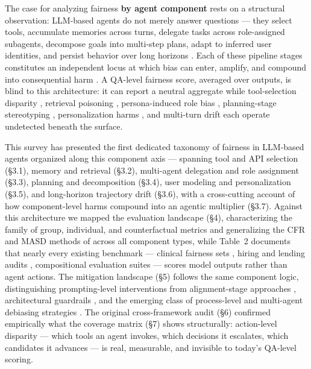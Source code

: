 \documentclass[sigconf,nonacm]{acmart}
\begin{document}
The case for analyzing fairness \textbf{by agent component} rests on a structural observation: LLM-based agents do not merely answer questions — they select tools, accumulate memories across turns, delegate tasks across role-assigned subagents, decompose goals into multi-step plans, adapt to inferred user identities, and persist behavior over long horizons \cite{wang2024survey,xi2023rise}. Each of these pipeline stages constitutes an independent locus at which bias can enter, amplify, and compound into consequential harm \cite{gallegos2024bias,madigan2025emergent}. A QA-level fairness score, averaged over outputs, is blind to this architecture: it can report a neutral aggregate while tool-selection disparity \cite{blankenstein2025biasbusters,xu2026ducx}, retrieval poisoning \cite{wu2024rag,hu2024free}, persona-induced role bias \cite{cao2026from,gupta2023bias}, planning-stage stereotyping \cite{li2025actions,parziale2026once}, personalization harms \cite{weissburg2024llms,kantharuban2024stereotype}, and multi-turn drift \cite{ma2026implicit,simhi2026old} each operate undetected beneath the surface.

This survey has presented the first dedicated taxonomy of fairness in LLM-based agents organized along this component axis — spanning tool and API selection (§3.1), memory and retrieval (§3.2), multi-agent delegation and role assignment (§3.3), planning and decomposition (§3.4), user modeling and personalization (§3.5), and long-horizon trajectory drift (§3.6), with a cross-cutting account of how component-level harms compound into an agentic multiplier (§3.7). Against this architecture we mapped the evaluation landscape (§4), characterizing the family of group, individual, and counterfactual metrics and generalizing the CFR and MASD methods of \citet{mayilvaghanan2026counterfactual} across all component types, while Table~2 documents that nearly every existing benchmark — clinical fairness sets \cite{xiao2025fairmedqa,adappanavar2025mfarm,ghosh2025medequalqa}, hiring and lending audits \cite{an2025measuring,azime2025accept}, compositional evaluation suites \cite{wang2024ceb} — scores model outputs rather than agent actions. The mitigation landscape (§5) follows the same component logic, distinguishing prompting-level interventions \cite{furniturewala2024thinking,li2024prompting} from alignment-stage approaches \cite{allam2024biasdpo,bai2022constitutional}, architectural guardrails \cite{dong2024building}, and the emerging class of process-level and multi-agent debiasing strategies \cite{owens2024multi,choi2025identity,ki2025multiple}. The original cross-framework audit (§6) confirmed empirically what the coverage matrix (§7) shows structurally: action-level disparity — which tools an agent invokes, which decisions it escalates, which candidates it advances — is real, measurable, and invisible to today's QA-level scoring.
\end{document}
